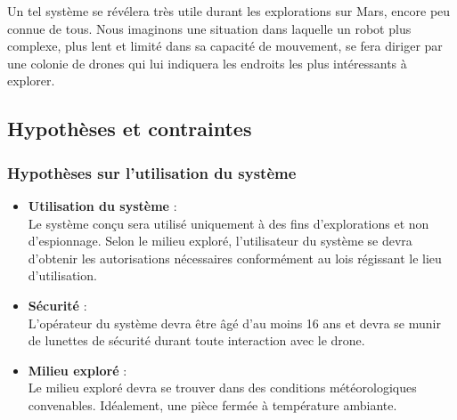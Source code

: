 \documentclass{mistcoursedoc}
\begin{document}
\par Un tel système se révélera très utile durant les explorations sur Mars, encore peu connue de tous.
Nous imaginons une situation dans laquelle un robot plus complexe,
plus lent et limité dans sa capacité de mouvement, se fera diriger par une colonie de drones qui
lui indiquera les endroits les plus intéressants à explorer.

\subsection{Hypothèses et contraintes}

\subsubsection{Hypothèses sur l'utilisation du système}

\begin{itemize}

  \item \textbf{Utilisation du système} :\\
        Le système conçu sera utilisé uniquement à des fins d'explorations et non d'espionnage.
        Selon le milieu exploré, l'utilisateur du système se devra d'obtenir les autorisations nécessaires conformément au lois régissant le lieu d’utilisation.
  \item \textbf{Sécurité} :\\
        L'opérateur du système devra être âgé d'au moins 16 ans et devra se munir de lunettes de sécurité durant toute
        interaction avec le drone.
  \item \textbf{Milieu exploré} :\\
        Le milieu exploré devra se trouver dans des conditions météorologiques convenables.
        Idéalement, une pièce fermée à température ambiante.

\end{itemize}
\end{document}
